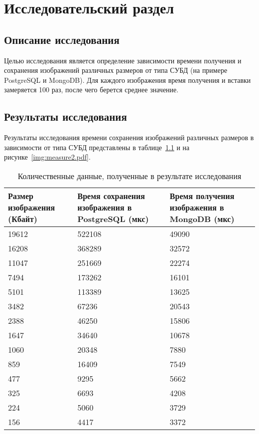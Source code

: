 \chapter{Исследовательский раздел}

\section{Описание исследования}

Целью исследования является определение зависимости времени получения и сохранения изображений различных размеров от типа СУБД (на примере PostgreSQL и MongoDB).
Для каждого изображения время получения и вставки замеряется 100 раз, после чего берется среднее значение.

\section{Результаты исследования}

Результаты исследования времени сохранения изображений различных размеров в зависимости от типа СУБД представлены в таблице~\ref{table:measure2} и на рисунке~\ref{img:measure2.pdf}.
\begin{table}[!ht]
	\centering
	\caption{\label{table:measure2} Количественные данные, полученные в результате исследования}
	\begin{tabularx}{\textwidth}{|X|X|X|}
		\hline
		Размер изображения (Кбайт) & Время сохранения изображения в PostgreSQL (мкс) & Время получения изображения в MongoDB (мкс) \\ \hline
      	19612 & 522108 & 49090 \\ \hline
		16208 & 368289 & 32572 \\ \hline
		11047 & 251669 & 22274 \\ \hline
		7494 & 173262 & 16101 \\ \hline
		5101 & 113389 & 13625 \\ \hline
		3482 & 67236 & 20543 \\ \hline
		2388 & 46250 & 15806 \\ \hline
		1647 & 34640 & 10678 \\ \hline
		1060 & 20348 & 7880 \\ \hline
		859 & 16409 & 7549 \\ \hline
		477 & 9295 & 5662 \\ \hline
		325 & 6693 & 4208 \\ \hline
		224 & 5060 & 3729 \\ \hline
		156 & 4417 & 3372 \\ \hline
	\end{tabularx}
\end{table}

